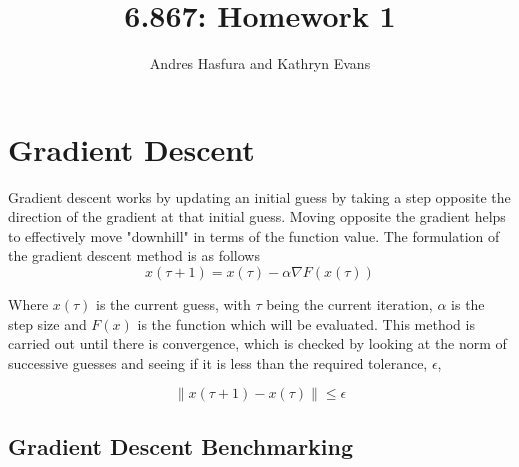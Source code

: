 \documentclass{article}
\begin{document}
\title{6.867: Homework 1}
\author{Andres Hasfura and Kathryn Evans}
\maketitle
\section{Gradient Descent}
Gradient descent works by updating an initial guess by taking a step opposite the direction of the gradient at that initial guess. Moving opposite the gradient helps  to effectively move "downhill" in terms of the function value.  The formulation of the gradient descent method is as follows
\begin{equation}
x(\tau+1) = x(\tau) - \alpha \nabla F(x(\tau))
\end{equation}

Where $ x(\tau)$ is the current guess, with $\tau$ being the current iteration, $\alpha$ is the step size and $F(x)$ is the function which will be evaluated. This method is carried out until there is convergence, which is checked by looking at the norm of successive guesses and seeing if it is less than the required tolerance, $\epsilon$,   


\begin{equation} 
\left \lVert x(\tau+1)-x(\tau) \right \rVert \leq \epsilon
\end{equation}



\subsection{ Gradient Descent Benchmarking}
\end{document}
